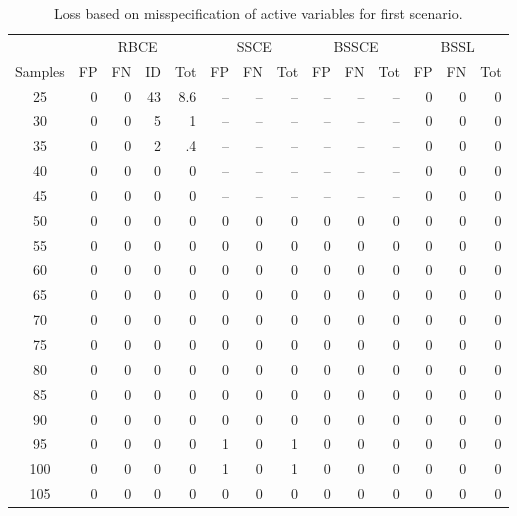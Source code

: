 \documentclass[preprint,12pt]{elsarticle}
\begin{document}
\begin{table}[ht]
\caption{Loss based on misspecification of active variables for first scenario.}\label{tab:misspec1}
\centering
\small
\begin{tabular}{|c||rrr|r||rr|r||rr|r||rr|r|}
  \hline
  &\multicolumn{4}{c||}{RBCE}&\multicolumn{3}{c||}{SSCE}
  &\multicolumn{3}{c||}{BSSCE}&\multicolumn{3}{c|}{BSSL}\\
  \cline{2-14}
 Samples & FP & FN & ID & Tot & FP & FN & Tot & FP & FN & Tot & FP & FN & Tot \\ 
  \hline
25 &   0 &   0 &  43 & 8.6 & -- &  --  &  -- &  --  &  -- &  --  &   0 &   0&   0  \\ 
  30 &   0 &   0 &   5 & 1 & -- &  --  &  -- &  --  &  -- &  --  &   0 &   0 &   0 \\ 
  35 &   0 &   0 &   2 & .4 & -- &  --  &  -- &  --  &  -- &  --  &   0 &   0 &   0 \\ 
  40 &   0 &   0 &   0 & 0 &  -- &  --  &  -- &  --  &  -- &  --  &   0 &   0 &   0 \\ 
  45 &   0 &   0 &   0 & 0 & -- &  --  &  -- &  --  &  -- &  --  &    0 &   0 &   0 \\ 
  50 &   0 &   0 &   0 & 0 &   0 &   0 &   0 &   0 &   0 &   0 &   0 &   0 &   0 \\ 
  55 &   0 &   0 &   0 &  0 &  0 &   0 &   0 &   0 &   0 &   0 &   0 &   0 &   0 \\ 
  60 &   0 &   0 &   0 &  0 &  0 &   0 &   0 &   0 &   0 &   0 &   0 &   0 &   0 \\ 
  65 &   0 &   0 &   0 &  0 &  0 &   0 &   0 &   0 &   0 &   0 &   0 &   0 &   0 \\ 
  70 &   0 &   0 &   0 &  0 &  0 &   0 &   0 &   0 &   0 &   0 &   0 &   0 &   0 \\ 
  75 &   0 &   0 &   0 &  0 &  0 &   0 &   0 &   0 &   0 &   0 &   0 &   0 &   0 \\ 
  80 &   0 &   0 &   0 &  0 &  0 &   0 &   0 &   0 &   0 &   0 &   0 &   0 &   0 \\ 
  85 &   0 &   0 &   0 &  0 &  0 &   0 &   0 &   0 &   0 &   0 &   0 &   0 &   0 \\ 
  90 &   0 &   0 &   0 &  0 &  0 &   0 &   0 &   0 &   0 &   0 &   0 &   0 &   0 \\ 
  95 &   0 &   0 &   0 &  0 &  1 &   0 & 1 &   0 &   0 &   0 &   0 &   0 &   0 \\ 
  100 &   0 &   0 &   0 &  0 &  1 &   0 & 1 &  0 &   0 &   0 &   0 &   0 &   0 \\ 
  105 &   0 &   0 &   0 &  0 &  0 &   0 &   0 &   0 &   0 &   0 &   0 &   0 &   0 \\ 

\end{tabular}
\end{table}
\end{document}
